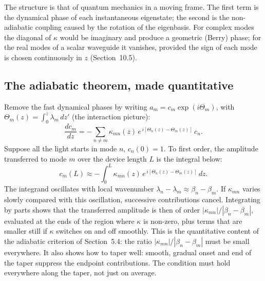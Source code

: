 \documentclass[11pt,a4paper]{article}
\begin{document}
The structure is that of quantum mechanics in a moving frame. The first term is the dynamical phase of each instantaneous eigenstate; the second is the non-adiabatic coupling caused by the rotation of the eigenbasis. For complex modes the diagonal of $\kappa$ would be imaginary and produce a geometric (Berry) phase; for the real modes of a scalar waveguide it vanishes, provided the sign of each mode is chosen continuously in $z$ (Section~10.5).

\subsection{The adiabatic theorem, made quantitative}
Remove the fast dynamical phases by writing $a_m = c_m \exp(i\Theta_m)$, with $\Theta_m(z) = \int_0^z \lambda_m\, dz'$ (the interaction picture):
\begin{equation}
\frac{d c_m}{dz} = - \sum_{n\neq m} \kappa_{mn}(z)\, e^{\,i\left[\Theta_n(z) - \Theta_m(z)\right]}\, c_n.
\label{eq:interaction}
\end{equation}
Suppose all the light starts in mode $n$, $c_n(0) = 1$. To first order, the amplitude transferred to mode $m$ over the device length $L$ is the integral below:
\begin{equation}
c_m(L) \approx - \int_0^L \kappa_{mn}(z)\, e^{\,i\left[\Theta_n(z) - \Theta_m(z)\right]}\, dz.
\label{eq:transfer_amp}
\end{equation}
The integrand oscillates with local wavenumber $\lambda_n - \lambda_m \approx \beta_n - \beta_m$. If $\kappa_{mn}$ varies slowly compared with this oscillation, successive contributions cancel. Integrating by parts shows that the transferred amplitude is then of order $|\kappa_{mn}|/|\beta_n - \beta_m|$, evaluated at the ends of the region where $\kappa$ is non-zero, plus terms that are smaller still if $\kappa$ switches on and off smoothly. This is the quantitative content of the adiabatic criterion of Section~5.4: the ratio $|\kappa_{mn}|/|\beta_n - \beta_m|$ must be small everywhere. It also shows how to taper well: smooth, gradual onset and end of the taper suppress the endpoint contributions. The condition must hold everywhere along the taper, not just on average.
\end{document}
